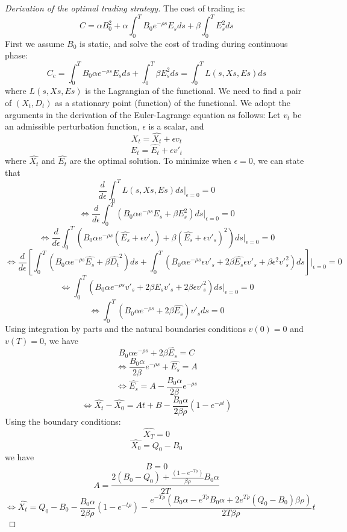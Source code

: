 \documentclass{article}
\begin{document}
\begin{proof}[Derivation of the optimal trading strategy]\label{proof:optimal-strategy}
  The cost of trading is:
  \[
    C = \alpha B_0^2  + \alpha \int_0^T B_0 e^{-\rho s} E_s ds + \beta \int_0^T E_s^2 ds
  \]
  First we assume $B_0$ is static, and solve the cost of trading during continuous phase:
  \[
    C_c = \int_0^T B_0 \alpha e^{-\rho s} E_s ds + \int_0^T \beta E_s^2 ds = \int_0^T L(s, Xs, Es) ds
  \]
  where $ L(s, Xs, Es)$ is the Lagrangian of the functional. We need to find a pair of $(X_t, D_t)$ as a stationary point (function) of the functional. We adopt the arguments in the derivation of the Euler-Lagrange equation as follows:
  Let $v_t$ be an admissible perturbation function, $\epsilon$ is a scalar, and
  \[
    X_t = \hat{X_t} + \epsilon v_t
  \]
  \[
    E_t = \hat{E_t} + \epsilon {v'}_t
  \]
  where $\hat{X_t}$ and $\hat{E_t}$ are the optimal solution. To minimize when $\epsilon=0$, we can state that
  \[
    \frac{d}{d\epsilon} \int_0^T L(s, Xs, Es) ds|_{\epsilon=0}=0
  \]
  \[
    \Leftrightarrow \frac{d}{d\epsilon} \int_0^T (B_0 \alpha e^{-\rho s} E_s + \beta E_s^2) ds|_{\epsilon=0}=0
  \]
  \[
    \Leftrightarrow \frac{d}{d\epsilon} \int_0^T (B_0 \alpha e^{-\rho s} (\hat{E_s} + \epsilon {v'}_s) + \beta (\hat{E_s} + \epsilon {v'}_s)^2) ds|_{\epsilon=0}=0
  \]
  \[
    \Leftrightarrow \frac{d}{d\epsilon} \left[\int_0^T (B_0 \alpha e^{-\rho s} \hat{E_s} + \beta \hat{D_t}^2 ) ds  + \int_0^T (B_0 \alpha e^{-\rho s}\epsilon {v'}_s + 2\beta\hat{E_s}\epsilon{v'}_s + \beta\epsilon^2{v'}^2_s)ds\right]|_{\epsilon=0}=0
  \]
  \[
    \Leftrightarrow \int_0^T (B_0 \alpha e^{-\rho s} {v'}_s + 2\beta\hat{E_s}{v'}_s + 2\beta\epsilon{v'}^2_s)ds|_{\epsilon=0} = 0
  \]
  \[
    \Leftrightarrow \int_0^T (B_0 \alpha e^{-\rho s}  + 2\beta\hat{E_s}) {v'}_s ds = 0
  \]
  Using integration by parts and the natural boundaries conditions $v(0)=0$ and $v(T)=0$, we have
  \[
    B_0 \alpha e^{-\rho s}  + 2\beta\hat{E_s} = C
  \]
  \[
    \Leftrightarrow \frac{B_0 \alpha}{2\beta} e^{-\rho s}  + \hat{E_s} = A
  \]
  \[
    \Leftrightarrow \hat{E_s} = A - \frac{B_0 \alpha}{2\beta} e^{-\rho s}
  \]
  \[
    \Leftrightarrow \hat{X_t} - \hat{X_0} = At + B - \frac{B_0 \alpha}{2\beta \rho} (1 - e^{-\rho t})
  \]
  Using the boundary conditions:
  \[
    \hat{X_T} = 0
  \]
  \[
    \hat{X_0} = Q_0 - B_0
  \]
  we have
  \[
    B = 0
  \]
  \[
    A = \frac{2 (B_0 - Q_0) + \frac{(1 - e^{-T \rho})}{\beta \rho} B_0 \alpha} {2 T}
  \]
  \[
    \Leftrightarrow \hat{X_t} = Q_0 - B_0  - \frac{B_0 \alpha}{2 \beta \rho}(1 - e^{-t \rho}) - \frac{e^{-T \rho} (B_0 \alpha - e^{T \rho}B_0 \alpha + 2 e^{T \rho} (Q_0 - B_0) \beta \rho )}{2 T \beta \rho} t
\]
\end{proof}
\end{document}
